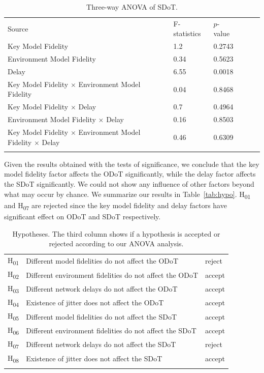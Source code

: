 \begin{table}[!htbp]
\caption{Three-way ANOVA of SDoT.}
\label{tab:tam}
\begin{tabular}{llllll}
\hline\noalign{\smallskip}
Source & F-statistics & $p$-value \\
\noalign{\smallskip}\hline\noalign{\smallskip}
Key Model Fidelity & 1.2 & 0.2743 \\
Environment Model Fidelity & 0.34 & 0.5623 \\
Delay & 6.55 & 0.0018 \\
Key Model Fidelity $\times$ Environment Model Fidelity & 0.04 & 0.8468 \\
Key Model Fidelity $\times$ Delay & 0.7 & 0.4964 \\
Environment Model Fidelity $\times$ Delay & 0.16 & 0.8503 \\
Key Model Fidelity $\times$ Environment Model Fidelity $\times$ Delay & 0.46 & 0.6309 \\
\noalign{\smallskip}\hline
\end{tabular}
\end{table}

Given the results obtained with the tests of significance, we conclude that the key model fidelity factor affects the ODoT significantly, while the delay factor affects the SDoT significantly. We could not show any influence of other factors beyond what may occur by chance. We summarize our results in Table~\ref{tab:hypo}.
H\textsubscript{01} and H\textsubscript{07} are rejected since the key model fidelity and delay factors have significant effect on ODoT and SDoT respectively.

\begin{table}[!htbp]
\caption{Hypotheses. The third column shows if a hypothesis is accepted or rejected according to our ANOVA analysis.}
\label{tab:results}
\begin{tabular}{lll}
\hline\noalign{\smallskip}
H\textsubscript{01} & Different model fidelities do not affect the ODoT & reject \\
H\textsubscript{02} & Different environment fidelities do not affect the ODoT & accept \\
H\textsubscript{03} & Different network delays do not affect the ODoT & accept \\
H\textsubscript{04} & Existence of jitter does not affect the ODoT & accept \\
H\textsubscript{05} & Different model fidelities do not affect the SDoT & accept \\
H\textsubscript{06} & Different environment fidelities do not affect the SDoT & accept \\
H\textsubscript{07} & Different network delays do not affect the SDoT & reject \\
H\textsubscript{08} & Existence of jitter does not affect the SDoT & accept \\
\noalign{\smallskip}\hline
\end{tabular}
\end{table}

